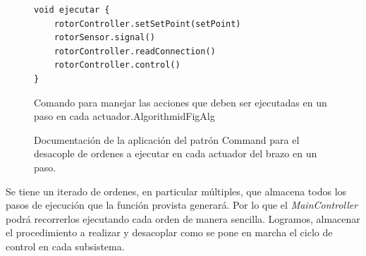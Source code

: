 \begin{figure}
\begin{lstlisting}[caption=Ejemplo OrdenRotor]
void ejecutar {
    rotorController.setSetPoint(setPoint)
    rotorSensor.signal()
    rotorController.readConnection()
    rotorController.control()
}
\end{lstlisting}
\end{figure}


\begin{figure}[h]
\caption{Documentación de la aplicación del patrón Command para el desacople de ordenes a ejecutar en cada actuador del brazo en un paso.}
\label{docCommandSteps}
\begin{pattern}[]{Comando para manejar las acciones que deben ser ejecutadas en un paso en cada actuador.}{Algorithm}{idFigAlg}
\assigns
{}

\end{pattern}
\end{figure}


Se tiene un iterado de ordenes, en particular múltiples, que almacena todos los pasos de ejecución que la función provista generará. Por lo que el \textit{MainController} podrá recorrerlos ejecutando cada orden de manera sencilla. Logramos, almacenar el procedimiento a realizar y desacoplar como se pone en marcha el ciclo de control en cada subsistema.

